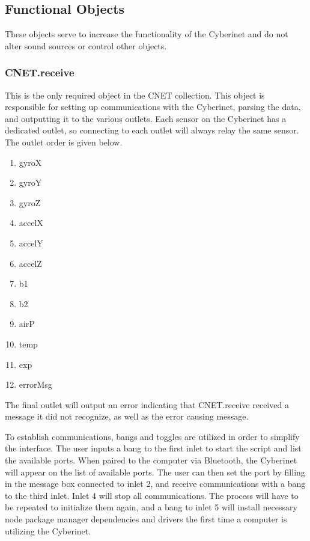 \subsection{Functional Objects}
These objects serve to increase the functionality of the Cyberinet and do not alter sound sources or control other objects.

\subsubsection{CNET.receive}
This is the only required object in the CNET collection. This object is responsible for setting up communications with the Cyberinet, parsing the data, and outputting it to the various outlets. Each sensor on the Cyberinet has a dedicated outlet, so connecting to each outlet will always relay the same sensor. The outlet order is given below.

\begin{enumerate}
    \item gyroX
    \item gyroY
    \item gyroZ
    \item accelX
    \item accelY
    \item accelZ
    \item b1
    \item b2
    \item airP
    \item temp
    \item exp
    \item errorMsg
\end{enumerate}

The final outlet will output an error indicating that CNET.receive received a message it did not recognize, as well as the error causing message.

To establish communications, bangs and toggles are utilized in order to simplify the interface. The user inputs a bang to the first inlet to start the script and list the available ports. When paired to the computer via Bluetooth, the Cyberinet will appear on the list of available ports. The user can then set the port by filling in the message box connected to inlet 2, and receive communications with a bang to the third inlet. Inlet 4 will stop all communications. The process will have to be repeated to initialize them again, and a bang to inlet 5 will install necessary node package manager dependencies and drivers the first time a computer is utilizing the Cyberinet.

